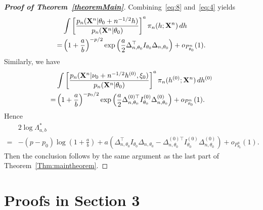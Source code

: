 \documentclass[11pt]{article}
\theoremstyle{plain}
\theoremstyle{definition}
\theoremstyle{remark}
\begin{document}
\begin{appendices}
\begin{proof}[\textbf{Proof of Theorem~\ref{theoremMain}}]
Combining~\eqref{eq:8} and~\eqref{eq:4} yields
\begin{equation*}
    \begin{split}
    &\int \left[ \frac{p_n(\mathbf{X}^{n}|\theta_0+n^{-1/2}h)}{p_n(\mathbf{X}^{n}|\theta_0)}\right]^a \pi_n (h;\mathbf{X}^{n}) \, dh
    \\
    =&\left(1+\frac{a}{b}\right)^{-p/2} \exp\left(\frac{a}{2}\Delta_{n,\theta_0}^\top  I_{\theta_0}\Delta_{n,\theta_0}\right)+o_{P_{\theta_0}^n}(1).
    \end{split}
\end{equation*}
Similarly, we have
\begin{equation*}
    \begin{split}
    &\int \left[ \frac{p_n(\mathbf{X}^{n}|\nu_0+n^{-1/2}h^{(0)},\xi_0)}{p_n(\mathbf{X}^{n}|\theta_0)}\right]^a \pi_n (h^{(0)};\mathbf{X}^{n}) \, dh^{(0)}
    \\
    =&\left(1+\frac{a}{b}\right)^{-p_0/2} \exp\left(\frac{a}{2}\Delta_{n,\theta_0}^{(0)\top} I^{(0)}_{\theta_0}\Delta^{(0)}_{n,\theta_0}\right)+o_{P_{\theta_0}^n}(1).
    \end{split}
\end{equation*}
Hence
\begin{equation*}
    \begin{aligned} 
        &2\log \Lambda_{a,b}^*\\
        =&
        -{(p-p_0)}\log (1+\frac{a}{b})+{a}\left(
\Delta_{n,\theta_0}^\top  I_{\theta_0}\Delta_{n,\theta_0}
        -\Delta_{n,\theta_0}^{(0)\top} I^{(0)}_{\theta_0}\Delta^{(0)}_{n,\theta_0}\right)
        +o_{P^n_{\theta_0}}(1).
    \end{aligned}
\end{equation*}
Then the conclusion follows by the same argument as the last part of Theorem~\ref{Thm:maintheorem}.
\end{proof}

\section{Proofs in Section 3}


\end{appendices}
\end{document}
